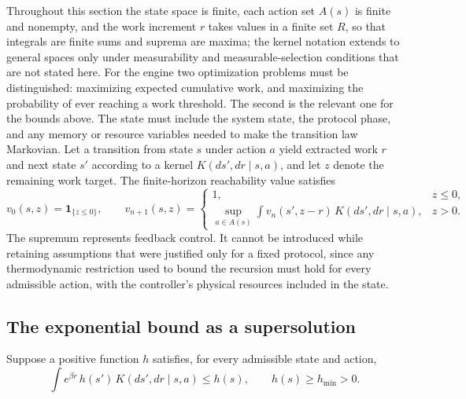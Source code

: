 \documentclass[11pt]{article}
\theoremstyle{definition}
\theoremstyle{remark}
\begin{document}
Throughout this section the state space is finite, each action set $A(s)$ is finite and nonempty, and the work increment $r$ takes values in a finite set $R$, so that integrals are finite sums and suprema are maxima; the kernel notation extends to general spaces only under measurability and measurable-selection conditions that are not stated here. For the engine two optimization problems must be distinguished: maximizing expected cumulative work, and maximizing the probability of ever reaching a work threshold. The second is the relevant one for the bounds above. The state must include the system state, the protocol phase, and any memory or resource variables needed to make the transition law Markovian. Let a transition from state $s$ under action $a$ yield extracted work $r$ and next state $s'$ according to a kernel $K(ds', dr \mid s, a)$, and let $z$ denote the remaining work target. The finite-horizon reachability value satisfies
\[
v_0(s,z) = \mathbf 1_{\{z \le 0\}},
\qquad
v_{n+1}(s,z) =
\begin{cases}
1, & z \le 0,\\[1mm]
\displaystyle \sup_{a \in A(s)} \int v_n(s', z - r)\, K(ds', dr \mid s, a), & z > 0 .
\end{cases}
\]
The supremum represents feedback control. It cannot be introduced while retaining assumptions that were justified only for a fixed protocol, since any thermodynamic restriction used to bound the recursion must hold for every admissible action, with the controller's physical resources included in the state.

\subsection{The exponential bound as a supersolution}

Suppose a positive function $h$ satisfies, for every admissible state and action,
\[
\int e^{\beta r}\, h(s')\, K(ds', dr \mid s, a) \le h(s),
\qquad h(s) \ge h_{\min} > 0 .
\]
\end{document}
